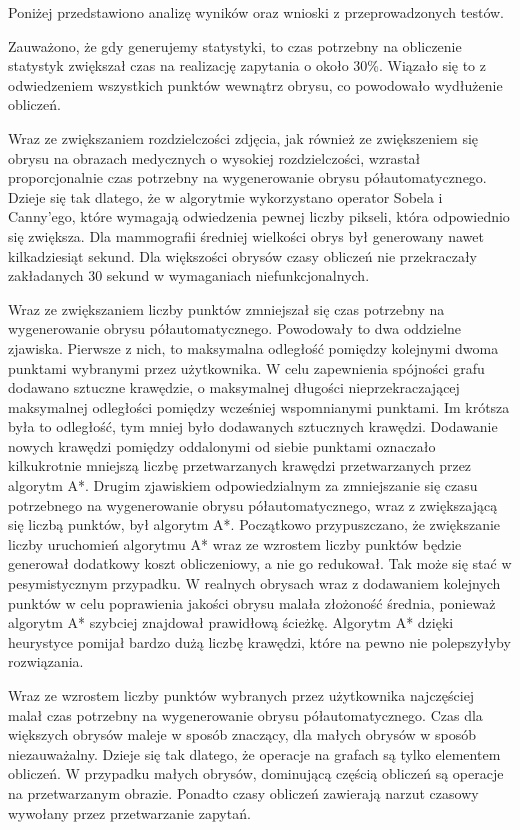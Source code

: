 \documentclass[a4paper,11pt,twoside,openright]{report}
\theoremstyle{definition}
\begin{document}
Poniżej przedstawiono analizę wyników oraz wnioski z przeprowadzonych testów.

Zauważono, że gdy generujemy statystyki, to czas potrzebny na obliczenie statystyk
zwiększał czas na realizację zapytania o około 30\%. Wiązało się to z odwiedzeniem
wszystkich punktów wewnątrz obrysu, co powodowało wydłużenie obliczeń.

Wraz ze zwiększaniem rozdzielczości zdjęcia, jak również ze zwiększeniem się
obrysu na obrazach medycznych o wysokiej rozdzielczości, wzrastał proporcjonalnie
czas potrzebny na wygenerowanie obrysu półautomatycznego. Dzieje się tak dlatego,
że w algorytmie wykorzystano operator Sobela i Canny'ego, które wymagają odwiedzenia
pewnej liczby pikseli, która odpowiednio się zwiększa. Dla mammografii średniej
wielkości obrys był generowany nawet kilkadziesiąt sekund. Dla większości obrysów
czasy obliczeń nie przekraczały zakładanych 30 sekund w wymaganiach niefunkcjonalnych.

Wraz ze zwiększaniem liczby punktów zmniejszał się czas potrzebny na wygenerowanie
obrysu półautomatycznego. Powodowały to dwa oddzielne zjawiska. Pierwsze z nich, to
maksymalna odległość pomiędzy kolejnymi dwoma punktami wybranymi przez użytkownika.
W celu zapewnienia spójności grafu dodawano sztuczne krawędzie, o maksymalnej długości
nieprzekraczającej maksymalnej odległości pomiędzy wcześniej wspomnianymi punktami.
Im krótsza była to odległość, tym mniej było dodawanych sztucznych krawędzi.
Dodawanie nowych krawędzi pomiędzy oddalonymi od siebie punktami oznaczało
kilkukrotnie mniejszą liczbę przetwarzanych krawędzi przetwarzanych przez algorytm
A*. Drugim zjawiskiem odpowiedzialnym za zmniejszanie się czasu potrzebnego na
wygenerowanie obrysu półautomatycznego, wraz z zwiększającą się liczbą punktów,
był algorytm A*. Początkowo przypuszczano, że zwiększanie liczby uruchomień algorytmu
A* wraz ze wzrostem liczby punktów będzie generował dodatkowy koszt obliczeniowy,
a nie go redukował. Tak może się stać w pesymistycznym przypadku. W realnych
obrysach wraz z dodawaniem kolejnych punktów w celu poprawienia jakości obrysu
malała złożoność średnia, ponieważ algorytm A* szybciej znajdował prawidłową
ścieżkę. Algorytm A* dzięki heurystyce pomijał bardzo dużą liczbę krawędzi,
które na pewno nie polepszyłyby rozwiązania.

Wraz ze wzrostem liczby punktów wybranych przez użytkownika najczęściej malał
czas potrzebny na wygenerowanie obrysu półautomatycznego. Czas dla większych
obrysów maleje w sposób znaczący, dla małych obrysów w sposób niezauważalny.
Dzieje się tak dlatego, że operacje na grafach są tylko elementem obliczeń. W
przypadku małych obrysów, dominującą częścią obliczeń są operacje na przetwarzanym
obrazie. Ponadto czasy obliczeń zawierają narzut czasowy wywołany przez
przetwarzanie zapytań.
\end{document}
